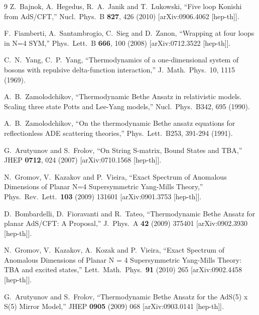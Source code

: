 \documentclass[a4paper]{article}
\numberwithin{equation}{section}
\begin{document}
\begin{thebibliography} {9}
  Z.~Bajnok, A.~Hegedus, R.~A.~Janik and T.~Lukowski,
  ``Five loop Konishi from AdS/CFT,''
  Nucl.\ Phys.\ B {\bf 827}, 426 (2010)
  [arXiv:0906.4062 [hep-th]].
  
  F.~Fiamberti, A.~Santambrogio, C.~Sieg and D.~Zanon,
  ``Wrapping at four loops in N=4 SYM,''
  Phys.\ Lett.\ B {\bf 666}, 100 (2008)
  [arXiv:0712.3522 [hep-th]].
  
	C.~N.~Yang, C.~P.~Yang, 
	``Thermodynamics of a one-dimensional system of bosons with repulsive delta-function interaction,''
	J.\ Math.\ Phys.\ 10, 1115 (1969).

	A.~B.~Zamolodchikov, 
	``Thermodynamic Bethe Ansatz in relativistic models. Scaling three state Potts and Lee-Yang models,''
	Nucl.\ Phys.\ B342, 695 (1990).

	A.~B.~Zamolodchikov,
	``On the thermodynamic Bethe ansatz equations for reflectionless ADE scattering theories,''
	Phys.\ Lett.\ B253, 391-294 (1991).
	
  G.~Arutyunov and S.~Frolov,
  ``On String S-matrix, Bound States and TBA,''
  JHEP {\bf 0712}, 024 (2007)
  [arXiv:0710.1568 [hep-th]].


  N.~Gromov, V.~Kazakov and P.~Vieira,
  ``Exact Spectrum of Anomalous Dimensions of Planar N=4 Supersymmetric Yang-Mills Theory,''
  Phys.\ Rev.\ Lett.\  {\bf 103} (2009) 131601
  [arXiv:0901.3753 [hep-th]].
  
  D.~Bombardelli, D.~Fioravanti and R.~Tateo,
  ``Thermodynamic Bethe Ansatz for planar AdS/CFT: A Proposal,''
  J.\ Phys.\ A {\bf 42} (2009) 375401
  [arXiv:0902.3930 [hep-th]].
  
  N.~Gromov, V.~Kazakov, A.~Kozak and P.~Vieira,
  ``Exact Spectrum of Anomalous Dimensions of Planar N = 4 Supersymmetric Yang-Mills Theory: TBA and excited states,''
  Lett.\ Math.\ Phys.\  {\bf 91} (2010) 265
  [arXiv:0902.4458 [hep-th]].

  G.~Arutyunov and S.~Frolov,
  ``Thermodynamic Bethe Ansatz for the AdS(5) x S(5) Mirror Model,''
  JHEP {\bf 0905} (2009) 068
  [arXiv:0903.0141 [hep-th]].


\end{thebibliography}
\end{document}
